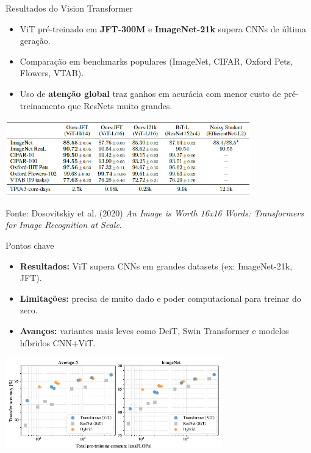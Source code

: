 \documentclass{beamer}
\begin{document}
\begin{frame}{Resultados do Vision Transformer}
\begin{itemize}
    \item ViT pré-treinado em \textbf{JFT-300M} e \textbf{ImageNet-21k} supera CNNs de última geração.
    \item Comparação em benchmarks populares (ImageNet, CIFAR, Oxford Pets, Flowers, VTAB).
    \item Uso de \textbf{atenção global} traz ganhos em acurácia com menor custo de pré-treinamento que ResNets muito grandes.
\end{itemize}
\vspace{0.3cm}
\begin{center}
    \includegraphics[width=0.8\textwidth]{assets/vit_results.png}
\end{center}

\tiny Fonte: Dosovitskiy et al. (2020) \textit{An Image is Worth 16x16 Words: Transformers for Image Recognition at Scale}.
\end{frame}

\begin{frame}{Pontos chave}
	\begin{itemize}
		\item \textbf{Resultados:} ViT supera CNNs em grandes datasets (ex: ImageNet-21k, JFT).
		\item \textbf{Limitações:} precisa de muito dado e poder computacional para treinar do zero.
		\item \textbf{Avanços:} variantes mais leves como DeiT, Swin Transformer e modelos híbridos CNN+ViT.
	\end{itemize}
\vspace{0.3cm}
	\begin{center}
		\includegraphics[width=0.7\textwidth]{assets/vit_hybrids.png} 
	\end{center}
\end{frame}
\end{document}
